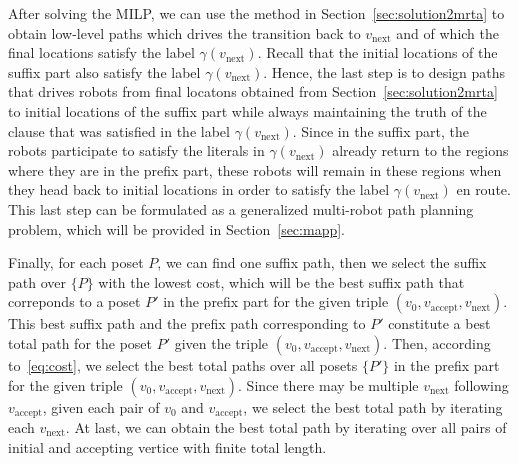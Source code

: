 \documentclass[Afour,sageh,times]{sagej}
\begin{document}
{After solving the MILP, we can use the method in Section~\ref{sec:solution2mrta} to obtain low-level paths which drives the transition back to $v_{\text{next}}$ and of which the final locations satisfy the label $\gamma(v_{\text{next}})$. Recall that the initial locations of the suffix part also satisfy the label $\gamma(v_{\text{next}})$. Hence, the last step is to design paths that drives robots from final locatons obtained from Section~\ref{sec:solution2mrta} to initial locations of the suffix part while always maintaining the truth of the  clause that was satisfied in the  label $\gamma(v_{\text{next}})$. Since in the suffix part, the robots participate to satisfy the literals in $\gamma(v_{\text{next}})$ already return to the regions where they are in the prefix part, these robots will remain in these regions when they head back to initial locations in order to satisfy the label $\gamma(v_{\text{next}})$ en route. This last step can be formulated as a generalized multi-robot path planning problem, which will be provided in Section~\ref{sec:mapp}.






Finally, for each poset $P$, we can find one suffix path, then we select the suffix path over $\{P\}$ with the lowest cost, which will be the best suffix path that correponds to a poset $P'$ in the prefix part for the given triple $(v_0, v_{\text{accept}}, v_{\text{next}})$. This best suffix path and the prefix path corresponding to $P'$ constitute a best total path for the poset $P'$ given the triple $(v_0, v_{\text{accept}}, v_{\text{next}})$. Then, according to~\eqref{eq:cost}, we select the best total paths over all posets $\{P'\}$ in the prefix part for the given triple $(v_0, v_{\text{accept}}, v_{\text{next}})$.  Since there may be multiple $v_{\text{next}}$ following $v_{\text{accept}}$, given each pair of $v_0$ and $v_{\text{accept}}$, we select the best total path by iterating each $v_{\text{next}}$. At last, we can obtain the best total path by iterating over all pairs of initial and accepting vertice with finite total length.


}
\end{document}
